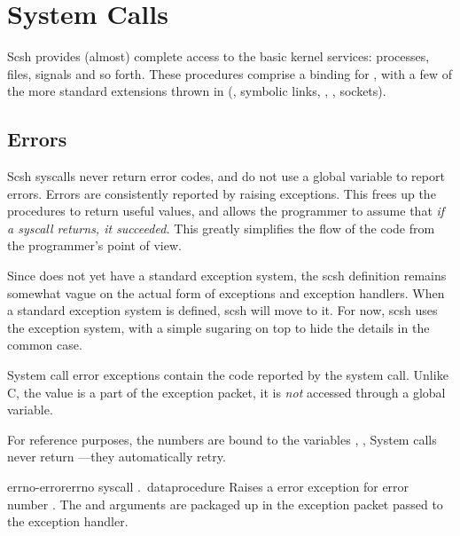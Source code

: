 
\chapter{System Calls}
\label{chapt:syscalls}

Scsh provides (almost) complete access to the basic {\Unix} kernel services:
processes, files, signals and so forth.  These procedures comprise a 
{\Scheme} binding for {\Posix}, with a few of the more standard extensions
thrown in (\eg, symbolic links, , , sockets).


\section{Errors}
Scsh syscalls never return error codes, and do not use a global
 variable to report errors.
Errors are consistently reported by raising exceptions.
This frees up the procedures to return useful values,
and allows the programmer to assume that 
\emph{if a syscall returns, it succeeded.}
This greatly simplifies the flow of the code from the programmer's point
of view.

Since {\Scheme} does not yet have a standard exception system, the scsh
definition remains somewhat vague on the actual form of exceptions
and exception handlers. When a standard exception system is defined,
scsh will move to it. For now, scsh uses the {\scm} exception system,
with a simple sugaring on top to hide the details in the common case.

System call error exceptions contain the {\Unix}  code reported by
the system call. Unlike C, the  value is a part of the exception
packet, it is \emph{not} accessed through a global variable.

For reference purposes, the {\Unix}  numbers 
are bound to the variables , , {\etc}
System calls never return ---they
automatically retry.

\begin{dfndesc}
    {errno-error}{errno syscall .\ data}{\noreturn}{procedure}
Raises a {\Unix} error exception for {\Unix} error number .
The  and  arguments are packaged up in the exception
packet passed to the exception handler.
\end{dfndesc}

